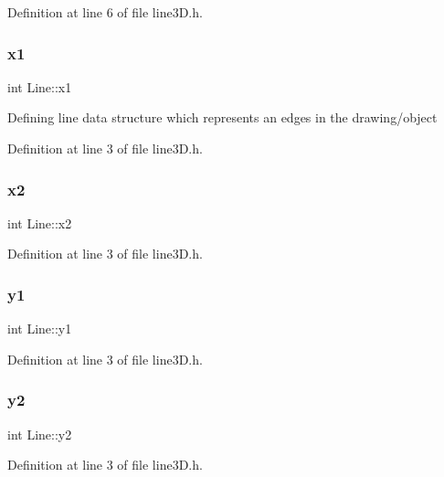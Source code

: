 Definition at line 6 of file line3\+D.\+h.

\mbox{\label{struct_line_a1c37aeef714f6c96454c2a9a2dadb69a}} 
\subsubsection{\texorpdfstring{x1}{x1}}
{\footnotesize\ttfamily int Line\+::x1}

Defining line data structure which represents an edges in the drawing/object 

Definition at line 3 of file line3\+D.\+h.

\mbox{\label{struct_line_a4f08d1038eba337d6f0fb32713e528f1}} 
\subsubsection{\texorpdfstring{x2}{x2}}
{\footnotesize\ttfamily int Line\+::x2}



Definition at line 3 of file line3\+D.\+h.

\mbox{\label{struct_line_a850c96af61bd595a68b5e867540204f1}} 
\subsubsection{\texorpdfstring{y1}{y1}}
{\footnotesize\ttfamily int Line\+::y1}



Definition at line 3 of file line3\+D.\+h.

\mbox{\label{struct_line_ae31c92ab0df730a2fdd34201ce6feb9d}} 
\subsubsection{\texorpdfstring{y2}{y2}}
{\footnotesize\ttfamily int Line\+::y2}



Definition at line 3 of file line3\+D.\+h.

\mbox{\label{struct_line_a96c7c34bb26b387aed84206e8739a272}} 
